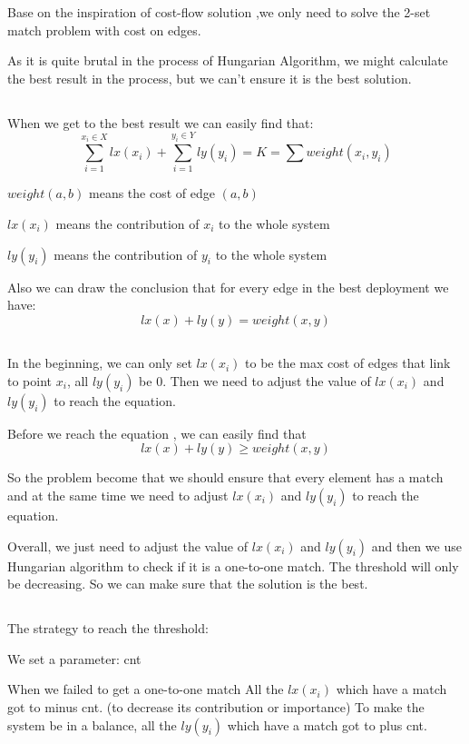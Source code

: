\documentclass[12pt]{article}
\begin{document}
Base on the inspiration of cost-flow solution ,we only need to solve the 2-set match problem with cost on edges.

As it is quite brutal in the process of Hungarian Algorithm, we might calculate the best result in the process, but we can’t ensure it is the best solution.
\subsection{}
When we get to the best result we can easily find that:
$$\sum_{i=1}^{x_{i}\in X}lx(x_{i})+\sum_{i=1}^{y_{i}\in Y}ly(y_{i})=K=\sum weight(x_{i},y_{i})$$

$weight(a,b)$ means the cost of edge $(a,b)$

$lx(x_{i})$ means the contribution of $x_{i}$ to the whole system

$ly(y_{i})$ means the contribution of $y_{i}$ to the whole system

Also we can draw the conclusion that for every edge in the best deployment we have:
$$lx(x)+ly(y)=weight(x,y)$$
\subsection{}
In the beginning, we can only set $lx(x_{i})$ to be the max cost of edges that link to point $x_{i}$, all $ly(y_{i})$ be $0$. Then we need to adjust the value of $lx(x_{i})$ and $ly(y_{i})$ to reach the equation.

Before we reach the equation , we can easily find that
$$lx(x)+ly(y)\geq weight(x,y)$$

So the problem become that we should ensure that every element has a match and at the same time we need to adjust $lx(x_{i})$ and $ly(y_{i})$ to reach the equation.

Overall, we just need to adjust the value of $lx(x_{i})$ and $ly(y_{i})$ and then we use Hungarian algorithm to check if it is a one-to-one match. The threshold will only be decreasing. So we can make sure that the solution is the best.

\subsection{}
The strategy to reach the threshold:

We set a parameter: cnt

When we failed to get a one-to-one match
All the $lx(x_{i})$ which have a match got to minus cnt. (to decrease its contribution or importance)
To make the system be in a balance, all the $ly(y_{i})$ which have a match got to plus cnt.
\end{document}
